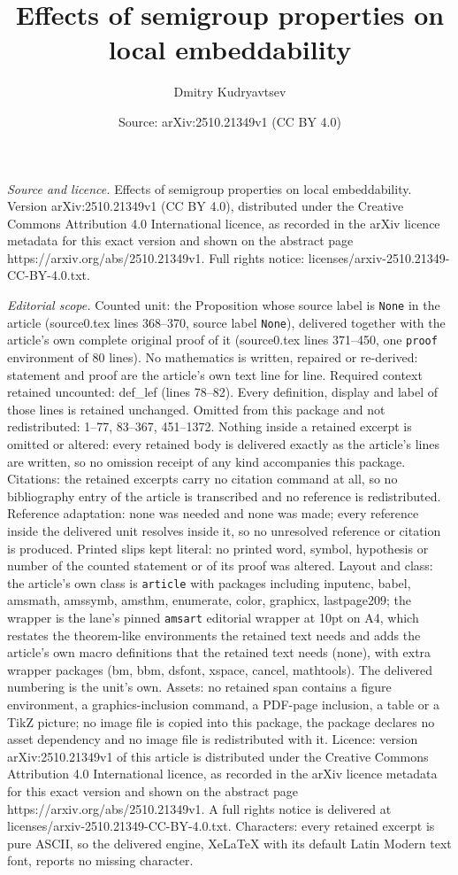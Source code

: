 \documentclass[10pt,a4paper]{amsart}
\title[Effects of semigroup properties on local embeddability]{Effects of semigroup properties on local embeddability}
\author{Dmitry Kudryavtsev}
\date{Source: arXiv:2510.21349v1 (CC BY 4.0)}
\begin{document}
\maketitle

\noindent\emph{Source and licence.} Effects of semigroup properties on local embeddability. Version arXiv:2510.21349v1 (CC BY 4.0), distributed under the Creative Commons Attribution 4.0 International licence, as recorded in the arXiv licence metadata for this exact version and shown on the abstract page https://arxiv.org/abs/2510.21349v1. Full rights notice: licenses/arxiv-2510.21349-CC-BY-4.0.txt.\par\smallskip

\noindent\textit{Editorial scope.} Counted unit: the Proposition whose source label is \texttt{None} in the article (source0.tex lines 368--370, source label \texttt{None}), delivered together with the article's own complete original proof of it (source0.tex lines 371--450, one \texttt{proof} environment of 80 lines). No mathematics is written, repaired or re-derived: statement and proof are the article's own text line for line. Required context retained uncounted: def\_lef (lines 78--82). Every definition, display and label of those lines is retained unchanged. Omitted from this package and not redistributed: 1--77, 83--367, 451--1372. Nothing inside a retained excerpt is omitted or altered: every retained body is delivered exactly as the article's lines are written, so no omission receipt of any kind accompanies this package. Citations: the retained excerpts carry no citation command at all, so no bibliography entry of the article is transcribed and no reference is redistributed. Reference adaptation: none was needed and none was made; every reference inside the delivered unit resolves inside it, so no unresolved reference or citation is produced. Printed slips kept literal: no printed word, symbol, hypothesis or number of the counted statement or of its proof was altered. Layout and class: the article's own class is \texttt{article} with packages including inputenc, babel, amsmath, amssymb, amsthm, enumerate, color, graphicx, lastpage209; the wrapper is the lane's pinned \texttt{amsart} editorial wrapper at 10pt on A4, which restates the theorem-like environments the retained text needs and adds the article's own macro definitions that the retained text needs (none), with extra wrapper packages (bm, bbm, dsfont, xspace, cancel, mathtools). The delivered numbering is the unit's own. Assets: no retained span contains a figure environment, a graphics-inclusion command, a PDF-page inclusion, a table or a TikZ picture; no image file is copied into this package, the package declares no asset dependency and no image file is redistributed with it. Licence: version arXiv:2510.21349v1 of this article is distributed under the Creative Commons Attribution 4.0 International licence, as recorded in the arXiv licence metadata for this exact version and shown on the abstract page https://arxiv.org/abs/2510.21349v1. A full rights notice is delivered at licenses/arxiv-2510.21349-CC-BY-4.0.txt. Characters: every retained excerpt is pure ASCII, so the delivered engine, XeLaTeX with its default Latin Modern text font, reports no missing character.
\end{document}

